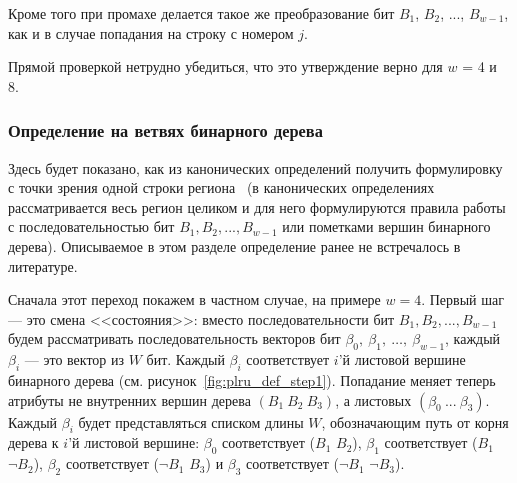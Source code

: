 \begin{enumerate}
\begin{utv}
Кроме того при промахе делается такое же преобразование бит $B_1$, $B_2$, ..., $B_{w{-}1}$, как и в случае попадания на строку с номером $j$.
\end{utv}

Прямой проверкой нетрудно убедиться, что это утверждение верно для $w$ = 4 и 8.

\subsubsection{Определение \PseudoLRU на ветвях бинарного
дерева}\label{sec:PseudoLRUonBranches}

Здесь будет показано, как из канонических определений \PseudoLRU
получить формулировку \PseudoLRU с точки зрения одной строки региона~\cite{my_lomonosov_2010}
(в канонических определениях рассматривается весь регион целиком и
для него формулируются правила работы с последовательностью бит $B_1,
B_2, ..., B_{w{-}1}$ или пометками вершин бинарного дерева). Описываемое в этом разделе определение \PseudoLRU ранее не встречалось в литературе.

Сначала этот переход покажем в частном случае, на примере $w=4$. Первый шаг --- это
смена <<состояния>>: вместо последовательности бит $B_1, B_2, ...,
B_{w-1}$ будем рассматривать последовательность векторов бит
$\beta_0,~\beta_1,~\dots,~\beta_{w-1}$, каждый $\beta_i$ --- это вектор из $W$ бит. Каждый $\beta_i$ соответствует $i$'й листовой вершине бинарного дерева (см. рисунок~\ref{fig:plru_def_step1}). Попадание
меняет теперь атрибуты не внутренних вершин дерева $(B_1~B_2~B_3)$, а листовых $(\beta_0~...~\beta_3)$.
Каждый $\beta_i$ будет представляться списком длины $W$, обозначающим путь от
корня дерева к $i$'й листовой вершине: $\beta_0$ соответствует
($B_1$ $B_2$), $\beta_1$ соответствует ($B_1$ $\neg B_2$), $\beta_2$
соответствует ($\neg B_1$ $B_3$) и $\beta_3$ соответствует ($\neg
B_1$ $ \neg B_3$).\\[0.5cm]


\end{enumerate}
